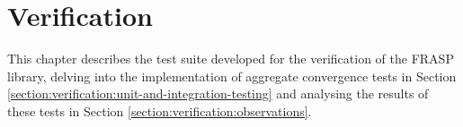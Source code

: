 
\chapter{Verification}
\label{chapter:verification}

This chapter describes the test suite developed for the verification of the
FRASP library, delving into the implementation of aggregate convergence tests
in Section \ref{section:verification:unit-and-integration-testing} and
analysing the results of these tests in Section
\ref{section:verification:observations}.


